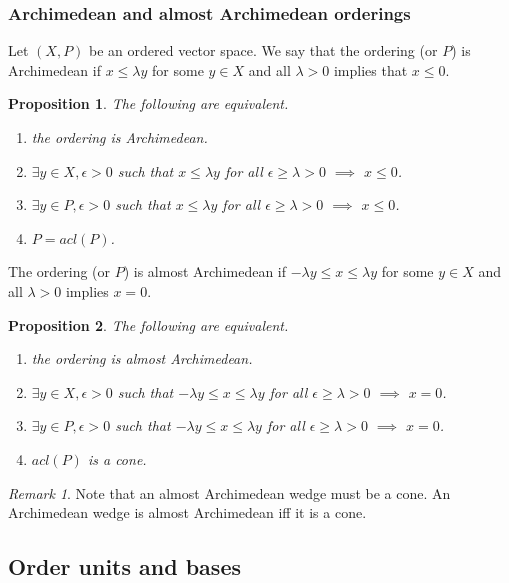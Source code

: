 \documentclass[12pt]{article}
\newtheorem{prop}{Proposition}
\theoremstyle{remark}
\newtheorem{rem}{Remark}
\newcommand{\<}{\langle}
\begin{document}
\subsubsection*{Archimedean and almost Archimedean orderings}

Let $(X,P)$ be an ordered vector space. We say that the ordering (or $P$) is Archimedean if 
 $x\le \lambda y$ for some $y\in X$ and all $\lambda> 0$ implies that $x\le 0$. 
\begin{prop}
The following are equivalent.
\begin{enumerate}
\item[(i)] the ordering is Archimedean.
\item[(ii)]  $\exists y\in X, \epsilon >0$ such that  $x\le \lambda y$ for all $\epsilon\ge \lambda>0$ $\implies$ $x\le 0$.
\item[(iii)] $\exists y\in P, \epsilon >0$ such that  $x\le \lambda y$ for all $\epsilon\ge \lambda>0$ $\implies$ $x\le 0$.
\item[(iv)] $P=acl(P)$.
\end{enumerate}
\end{prop}

The ordering (or $P$) is almost Archimedean if $-\lambda y\le x\le \lambda y$ for some $y\in X$ and  all $\lambda> 0$ implies  $x=0$.

\begin{prop}
The following are equivalent.
\begin{enumerate}
\item[(i)] the ordering is almost Archimedean.
\item[(ii)]  $\exists y\in X, \epsilon >0$ such that  $-\lambda y\le x\le \lambda y$ for all $\epsilon\ge \lambda>0$ $\implies$ $x= 0$.
\item[(iii)] $\exists y\in P, \epsilon >0$ such that  $-\lambda y\le x\le \lambda y$ for all $\epsilon\ge \lambda>0$ $\implies$ $x= 0$.
\item[(iv)] $acl(P)$ is a cone.
\end{enumerate}
\end{prop}

\begin{rem}
Note that an almost Archimedean wedge must be a cone. An Archimedean  wedge is almost Archimedean iff it is a cone.
\end{rem}






\subsection{Order units and bases}
\end{document}
